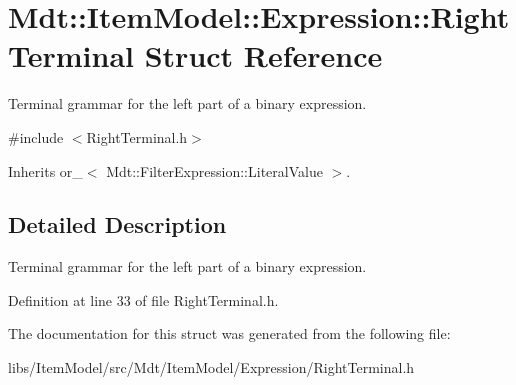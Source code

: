 \hypertarget{struct_mdt_1_1_item_model_1_1_expression_1_1_right_terminal}{}\section{Mdt\+:\+:Item\+Model\+:\+:Expression\+:\+:Right\+Terminal Struct Reference}
\label{struct_mdt_1_1_item_model_1_1_expression_1_1_right_terminal}


Terminal grammar for the left part of a binary expression.  




{\ttfamily \#include $<$Right\+Terminal.\+h$>$}



Inherits or\+\_\+$<$ Mdt\+::\+Filter\+Expression\+::\+Literal\+Value $>$.



\subsection{Detailed Description}
Terminal grammar for the left part of a binary expression. 

Definition at line 33 of file Right\+Terminal.\+h.



The documentation for this struct was generated from the following file\+:\begin{DoxyCompactItemize}
\item 
libs/\+Item\+Model/src/\+Mdt/\+Item\+Model/\+Expression/Right\+Terminal.\+h\end{DoxyCompactItemize}

